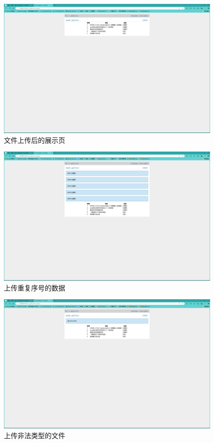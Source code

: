 \begin{figure}[!htbp]
    \centering
    \includegraphics[width=\textwidth]{figures/gallery_finish.png}
    \caption{文件上传后的展示页}\label{gallery_finish}
\end{figure}
\begin{figure}[!htbp]
    \centering
    \includegraphics[width=\textwidth]{figures/multi_no.png}
    \caption{上传重复序号的数据}\label{multi_no}
\end{figure}
\begin{figure}[!htbp]
    \centering
    \includegraphics[width=\textwidth]{figures/invalid_file.png}
    \caption{上传非法类型的文件}\label{invalid_file}
\end{figure}
